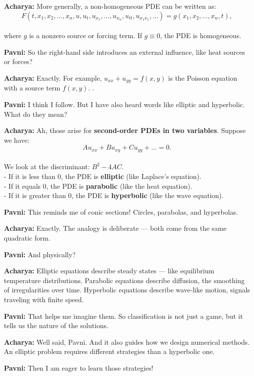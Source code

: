 \documentclass[
  letterpaper,
]{book}
\begin{document}
\textbf{Acharya:} More generally, a non-homogeneous PDE can be written
as:\\
\[ F(t, x_1, x_2, \dots, x_n, u, u_t, u_{x_1}, \dots, u_{x_n}, u_{tt}, u_{x_1x_1}, \dots) = g(x_1, x_2, \dots, x_n, t), \]\\
where \(g\) is a nonzero source or forcing term. If \(g \equiv 0\), the
PDE is homogeneous.

\textbf{Pavni:} So the right-hand side introduces an external influence,
like heat sources or forces?

\textbf{Acharya:} Exactly. For example, \(u_{xx} + u_{yy} = f(x,y)\) is
the Poisson equation with a source term \(f(x,y)\). .

\textbf{Pavni:} I think I follow. But I have also heard words like
elliptic and hyperbolic. What do they mean?

\textbf{Acharya:} Ah, those arise for \textbf{second-order PDEs in two
variables}. Suppose we have:\\
\[ A u_{xx} + B u_{xy} + C u_{yy} + \dots = 0. \]\\
We look at the discriminant: \(B^2 - 4AC\).\\
- If it is less than 0, the PDE is \textbf{elliptic} (like Laplace's
equation).\\
- If it equals 0, the PDE is \textbf{parabolic} (like the heat
equation).\\
- If it is greater than 0, the PDE is \textbf{hyperbolic} (like the wave
equation).

\textbf{Pavni:} This reminds me of conic sections! Circles, parabolas,
and hyperbolas.

\textbf{Acharya:} Exactly. The analogy is deliberate --- both come from
the same quadratic form.

\textbf{Pavni:} And physically?

\textbf{Acharya:} Elliptic equations describe steady states --- like
equilibrium temperature distributions. Parabolic equations describe
diffusion, the smoothing of irregularities over time. Hyperbolic
equations describe wave-like motion, signals traveling with finite
speed.

\textbf{Pavni:} That helps me imagine them. So classification is not
just a game, but it tells us the nature of the solutions.

\textbf{Acharya:} Well said, Pavni. And it also guides how we design
numerical methods. An elliptic problem requires different strategies
than a hyperbolic one.

\textbf{Pavni:} Then I am eager to learn those strategies!
\end{document}
